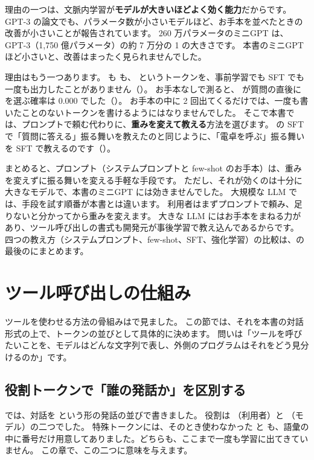 理由の一つは、文脈内学習が\textbf{モデルが大きいほどよく効く能力}だからです。
GPT-3 の論文でも、パラメータ数が小さいモデルほど、お手本を並べたときの改善が小さいことが報告されています\cite{brown2020language}。
260 万パラメータのミニGPT は、GPT-3（1,750 億パラメータ）の約 7 万分の 1 の大きさです。
本書のミニGPT ほど小さいと、改善はまったく見られませんでした。

理由はもう一つあります。
 も  も、 というトークンを、事前学習でも SFT でも一度も出力したことがありません（）。
お手本なしで測ると、 が質問の直後に  を選ぶ確率は 0.000 でした（）。
お手本の中に 2 回出てくるだけでは、一度も書いたことのないトークンを書けるようにはなりませんでした。
そこで本書では、プロンプトで頼む代わりに、\textbf{重みを変えて教える}方法を選びます。
の SFT で「質問に答える」振る舞いを教えたのと同じように、「電卓を呼ぶ」振る舞いを SFT で教えるのです（）。

まとめると、プロンプト（システムプロンプトと few-shot のお手本）は、重みを変えずに振る舞いを変える手軽な手段です。
ただし、それが効くのは十分に大きなモデルで、本書のミニGPT には効きませんでした。
大規模な LLM では、手段を試す順番が本書とは違います。
利用者はまずプロンプトで頼み、足りないと分かってから重みを変えます。
大きな LLM にはお手本をまねる力があり、ツール呼び出しの書式も開発元が事後学習で教え込んであるからです。
四つの教え方（システムプロンプト、few-shot、SFT、強化学習）の比較は、の最後のにまとめます。

\section{ツール呼び出しの仕組み}\label{sec:agent-toolcall}

ツールを使わせる方法の骨組みはで見ました。
この節では、それを本書の対話形式の上で、トークンの並びとして具体的に決めます。
問いは「ツールを呼びたいことを、モデルはどんな文字列で表し、外側のプログラムはそれをどう見分けるのか」です。

\subsection{役割トークンで「誰の発話か」を区別する}

では、対話を  という形の発話の並びで書きました。
役割は （利用者）と （モデル）の二つでした。
特殊トークンには、そのとき使わなかった  と  も、語彙の中に番号だけ用意してありました。どちらも、ここまで一度も学習に出てきていません。
この章で、この二つに意味を与えます。

